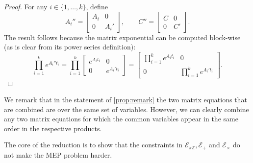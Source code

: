 \documentclass[format=acmsmall, review=false, screen=true]{acmart}
\newcommand{\Integers}{\mathbb{Z}}
\begin{document}
\begin{proof}
For any $i\in \lbrace 1,\ldots,k \rbrace$, define
\[A_i''=\begin{bmatrix}A_i&0\\0&A_i'\end{bmatrix},\qquad
C''=\begin{bmatrix}C&0\\0&C'\end{bmatrix}.\]
The result follows because the matrix exponential can be computed
block-wise (as is clear from its power series definition):
\[\prod_{i=1}^{k} e^{A_i''t_{i}}=\prod_{i=1}^{k}\begin{bmatrix}e^{A_{i} t_{i}}&0\\0&e^{A_i't_{i}}\end{bmatrix}=
\begin{bmatrix}\prod_{i=1}^{k} e^{A_{i} t_{i}}&0\\0&\prod_{i=1}^{k} e^{A_i't_{i}}\end{bmatrix}.\]
\end{proof}

We remark that in the statement of \cref{prop:remark} the
two matrix equations that are combined are over the same set of
variables.  However, we can clearly combine any two matrix equations
for which the common variables appear in the same order in the
respective products.

The core of the reduction is to show that the constraints in
$\mathcal{E}_{\pi\Integers},\mathcal{E}_{+}$ and
$\mathcal{E}_{\times}$ do not make the MEP problem harder.
\end{document}

